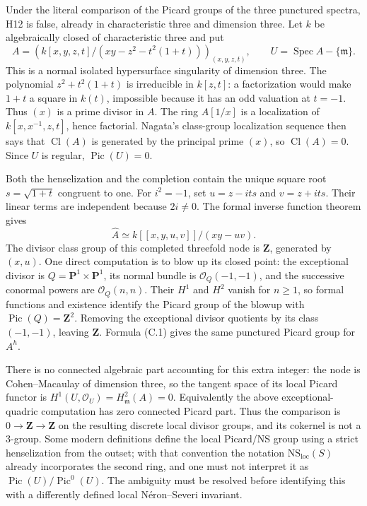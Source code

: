 Under the literal comparison of the Picard groups of the three punctured
spectra, H12 is false, already in characteristic three and dimension three.
Let $k$ be algebraically closed of characteristic three and put
\[
 A=\left(k[x,y,z,t]/(xy-z^2-t^2(1+t))\right)_{(x,y,z,t)},
 \qquad U=\operatorname{Spec}A-\{\mathfrak m\}.
\tag{C.2}
\]
This is a normal isolated hypersurface singularity of dimension three.
The polynomial $z^2+t^2(1+t)$ is irreducible in $k[z,t]$: a factorization
would make $1+t$ a square in $k(t)$, impossible because it has an odd valuation
at $t=-1$. Thus $(x)$ is a prime divisor in $A$. The ring $A[1/x]$ is a
localization of $k[x,x^{-1},z,t]$, hence factorial. Nagata's class-group
localization sequence then says that $\operatorname{Cl}(A)$ is generated by
the principal prime $(x)$, so $\operatorname{Cl}(A)=0$. Since $U$ is regular,
$\operatorname{Pic}(U)=0$.

Both the henselization and the completion contain the unique square root
$s=\sqrt{1+t}$ congruent to one. For $i^2=-1$, set $u=z-its$ and $v=z+its$.
Their linear terms are independent because $2i\ne0$. The formal inverse
function theorem gives
\[
 \widehat A\simeq k[[x,y,u,v]]/(xy-uv).
\]
The divisor class group of this completed threefold node is $\mathbf Z$,
generated by $(x,u)$. One direct computation is to blow up its closed point:
the exceptional divisor is $Q=\mathbf P^1\times\mathbf P^1$, its normal bundle
is $\mathcal O_Q(-1,-1)$, and the successive conormal powers are
$\mathcal O_Q(n,n)$. Their $H^1$ and $H^2$ vanish for $n\geq1$, so formal
functions and existence identify the Picard group of the blowup with
$\operatorname{Pic}(Q)=\mathbf Z^2$. Removing the exceptional divisor quotients
by its class $(-1,-1)$, leaving $\mathbf Z$. Formula (C.1) gives the same
punctured Picard group for $A^h$.

There is no connected algebraic part accounting for this extra integer:
the node is Cohen--Macaulay of dimension three, so the tangent space of its
local Picard functor is $H^1(U,\mathcal O_U)=H^2_{\mathfrak m}(A)=0$.
Equivalently the above exceptional-quadric computation has zero connected
Picard part. Thus the comparison is $0\to\mathbf Z\to\mathbf Z$ on the
resulting discrete local divisor groups, and its cokernel is not a $3$-group.
Some modern definitions define the local Picard/NS group using a strict
henselization from the outset; with that convention the notation
$\mathrm{NS}_{\mathrm{loc}}(S)$ already incorporates the second ring, and
one must not interpret it as $\operatorname{Pic}(U)/\operatorname{Pic}^0(U)$.
The ambiguity must be resolved before identifying this with a differently
defined local N\'eron--Severi invariant.

